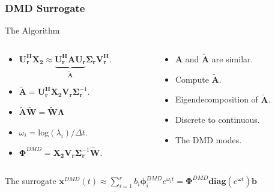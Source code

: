 \documentclass[fleqn]{beamer}
\renewcommand{\vec}[1]{\bm{#1}} %
\begin{document}
\begin{frame}
\frametitle{DMD Surrogate}
\begin{block}{The Algorithm}
\begin{columns}[c]
\begin{column}{0.45\textwidth}

\begin{itemize}
\item{}$\mathbf{U_r^{H}X_2} \approx \underbrace{\mathbf{U_r^{H} A U_r}}_{\tilde{\mathbf{A}}}\boldsymbol{\Sigma}\mathbf{_r}\mathbf{V_r^{H}}.$
\item{}$\mathbf{\tilde{A}}=\mathbf{U_r^{H}X_2}\mathbf{V_r}\boldsymbol{\Sigma}_{\mathbf{r}}^{-1}.$\pause
\item{}
 $\mathbf{\tilde{A} \tilde{W}}=\mathbf{\tilde{W}}\boldsymbol{\Lambda}$ \pause
\item{} $\omega_i= \text{log}(\lambda_i)/\Delta t.$
\item{} ${\boldsymbol{\Phi}}^{DMD}={\mathbf{X_2V_r}}\boldsymbol{\Sigma}_\mathbf{r}^{-1}{\mathbf{\tilde{W}}}.$

 \end{itemize}
\end{column}

\begin{column}{0.45\textwidth}
\begin{itemize}
\item{} $\mathbf{A}$ and $\mathbf{\tilde{A}}$ are similar.\vspace{1cm}
\item{} Compute  $\mathbf{\tilde{A}}$.
\item{} Eigendecomposition of $\mathbf{\tilde{A}}$.
\item{} Discrete to continuous.
\item{} The DMD modes.
\end{itemize}
\end{column}
\end{columns}
\end{block}
\begin{block}{The surrogate}
$\vec{x}^{DMD}(t)\approx \sum_{i=1}^{r} b_i \boldsymbol{\phi}_i^{DMD} e^{\omega_it}={{\boldsymbol{\Phi}}}^{DMD}{\mathbf{diag}}(e^{\vec{\omega}t})\vec{b}$
\end{block}
\end{frame}
\end{document}
